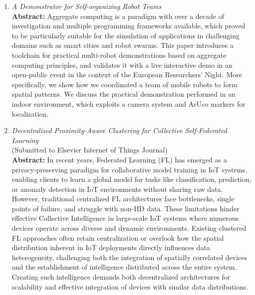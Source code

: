 \documentclass[runningheads]{llncs}
\begin{document}
\begin{enumerate}
    \item \emph{A Demonstrator for Self-organizing Robot Teams}~\cite{DBLP:conf/coordination/AguzziBBCCDFPV25} \\ 
    \textbf{Abstract: }
    Aggregate computing is a paradigm with over a decade of investigation and multiple programming frameworks available, 
     which proved to be particularly suitable for the simulation of applications in challenging domains such as smart cities
     and robot swarms. 
    This paper introduces a toolchain for practical multi-robot demonstrations based on aggregate computing principles, 
     and validates it with a live interactive demo in an open-public event in the context of the European Researchers' Night. 
    More specifically, we show how we coordinated a team of mobile robots to form spatial patterns.
    We discuss the practical demonstration performed in an indoor environment, 
     which exploits a camera system and ArUco markers for localization.
    \item \emph{Decentralized Proximity-Aware Clustering for Collective Self-Federated Learning} \\ (Submitted to Elsevier Internet of Things Journal) \\
    \textbf{Abstract: }
    In recent years, 
     Federated Learning (FL) has emerged as a privacy-preserving paradigm for collaborative model training in IoT systems, 
     enabling clients to learn a global model for tasks like classification, prediction, 
     or anomaly detection in IoT environments without sharing raw data.
    However, 
     traditional centralized FL architectures face bottlenecks, single points of failure, 
     and struggle with non-IID data.
    These limitations hinder effective Collective Intelligence in large-scale IoT systems 
     where numerous devices operate across diverse and dynamic environments.
    Existing clustered FL approaches often retain centralization or 
     overlook how the spatial distribution inherent in IoT deployments 
     directly influences data heterogeneity, 
     challenging both the integration of spatially correlated devices and the
     establishment of intelligence distributed across the entire system.
    Creating such intelligence demands both decentralized architectures for scalability 
     and effective integration of devices with similar data distributions.


\end{enumerate}
\end{document}
